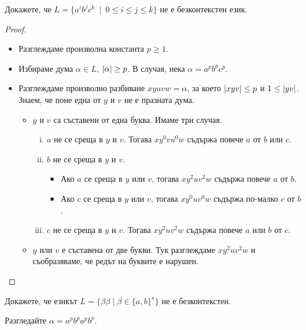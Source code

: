 \begin{problem}
  Докажете, че $L = \{a^ib^jc^k\ \mid\ 0 \leq i \leq j \leq k\}$ не е безконтекстен език.
\end{problem}
\begin{proof}
   \begin{itemize}
   \item 
     Разглеждаме произволна константа $p \geq 1$.
   \item
     Избираме дума $\alpha \in L$, $\lvert{\alpha}\rvert \geq p$.
     В случая, нека $\alpha = a^pb^pc^p$.
   \item
     Разглеждаме произволно разбиване $xyuvw = \alpha$, за което $\lvert{xyv}\rvert \leq p$ и $1 \leq \lvert{yv}\rvert$.
     Знаем, че поне една от $y$ и $v$ не е празната дума.
    \begin{itemize}
    \item
      $y$ и $v$ са съставени от една буква.
      Имаме три случая.
      \begin{enumerate}[i)]
      \item
        $a$ не се среща в $y$ и $v$.
        Тогава $xy^0vu^0w$ съдържа повече $a$ от $b$ или $c$.
      \item
        $b$ не се среща в $y$ и $v$.
        \begin{itemize}
        \item 
          Ако $a$ се среща в $y$ или $v$, тогава $xy^2uv^2w$ съдържа повече $a$ от $b$.
        \item
          Ако $c$ се среща в $y$ или $v$, тогава $xy^0uv^0w$ съдържа по-малко $c$ от $b$.
        \end{itemize}
      \item
        $c$ не се среща в $y$ и $v$.
        Тогава $xy^2uv^2w$ съдържа повече $a$ или $b$ от $c$.
      \end{enumerate}      
     \item
       $y$ или $v$ е съставена от две букви.
       Тук разглеждаме $xy^2uv^2w$ и съобразяваме, че редът на буквите е нарушен.
     \end{itemize}    
   \end{itemize}
\end{proof}

\begin{problem}
  Докажете, че езикът $L = \{\beta\beta\mid \beta\in \{a,b\}^\star\}$ не е безконтекстен.
\end{problem}
\begin{hint}
  Разгледайте $\alpha = a^pb^pa^pb^p$.
\end{hint}


